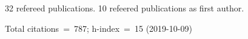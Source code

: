 32 refereed publications. 10 refeered publications as first author.

Total citations~=~787; h-index~=~15 (2019-10-09)
